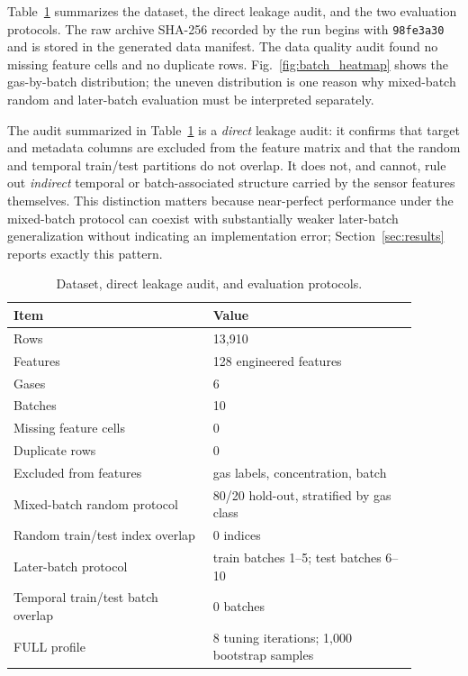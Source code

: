 \documentclass[conference]{IEEEtran}
\begin{document}
Table~\ref{tab:data_protocol} summarizes the dataset, the direct leakage audit, and the two evaluation protocols. The raw archive SHA-256 recorded by the run begins with \texttt{98fe3a30} and is stored in the generated data manifest. The data quality audit found no missing feature cells and no duplicate rows. Fig.~\ref{fig:batch_heatmap} shows the gas-by-batch distribution; the uneven distribution is one reason why mixed-batch random and later-batch evaluation must be interpreted separately.

The audit summarized in Table~\ref{tab:data_protocol} is a \emph{direct} leakage audit: it confirms that target and metadata columns are excluded from the feature matrix and that the random and temporal train/test partitions do not overlap. It does not, and cannot, rule out \emph{indirect} temporal or batch-associated structure carried by the sensor features themselves. This distinction matters because near-perfect performance under the mixed-batch protocol can coexist with substantially weaker later-batch generalization without indicating an implementation error; Section~\ref{sec:results} reports exactly this pattern.

\begin{table}[t]
\caption{Dataset, direct leakage audit, and evaluation protocols.}
\label{tab:data_protocol}
\centering
\footnotesize
\begin{tabular}{p{0.44\linewidth}p{0.45\linewidth}}
\toprule
Item & Value \\
\midrule
Rows & 13,910 \\
Features & 128 engineered features \\
Gases & 6 \\
Batches & 10 \\
Missing feature cells & 0 \\
Duplicate rows & 0 \\
Excluded from features & gas labels, concentration, batch \\
Mixed-batch random protocol & 80/20 hold-out, stratified by gas class \\
Random train/test index overlap & 0 indices \\
Later-batch protocol & train batches 1--5; test batches 6--10 \\
Temporal train/test batch overlap & 0 batches \\
FULL profile & 8 tuning iterations; 1{,}000 bootstrap samples \\
\bottomrule
\end{tabular}
\end{table}
\end{document}
